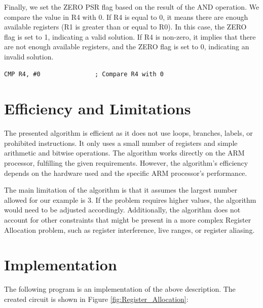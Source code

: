 Finally, we set the ZERO PSR flag based on the result of the AND operation. We compare the value in R4 with 0. If R4 is equal to 0, it means there are enough available registers (R1 is greater than or equal to R0). In this case, the ZERO flag is set to 1, indicating a valid solution. If R4 is non-zero, it implies that there are not enough available registers, and the ZERO flag is set to 0, indicating an invalid solution.

\begin{verbatim}
CMP R4, #0               ; Compare R4 with 0
\end{verbatim}

\section{Efficiency and Limitations}

The presented algorithm is efficient as it does not use loops, branches, labels, or prohibited instructions. It only uses a small number of registers and simple arithmetic and bitwise operations. The algorithm works directly on the ARM processor, fulfilling the given requirements. However, the algorithm's efficiency depends on the hardware used and the specific ARM processor's performance.

The main limitation of the algorithm is that it assumes the largest number allowed for our example is 3. If the problem requires higher values, the algorithm would need to be adjusted accordingly. Additionally, the algorithm does not account for other constraints that might be present in a more complex Register Allocation problem, such as register interference, live ranges, or register aliasing.



\section{Implementation}

The following program is an implementation of the above description. The created circuit is shown in Figure \ref{fig:Register_Allocation}:

